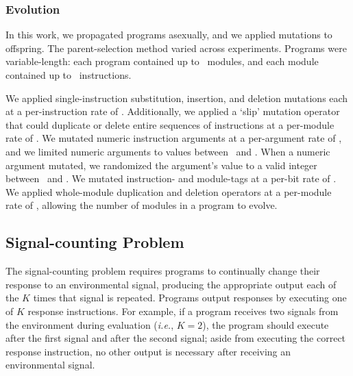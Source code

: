 \subsubsection{Evolution}

In this work, we propagated programs asexually, and we applied mutations to offspring.
The parent-selection method varied across experiments.
Programs were variable-length: each program contained up to \MaxFuncCnt\ modules, and each module contained up to \MaxFuncInstCnt\ instructions.


We applied single-instruction substitution, insertion, and deletion mutations each at a per-instruction rate of \MutRateInstPoint. 
Additionally, we applied a `slip' mutation operator \citep{lalejini_gene_2017} that could duplicate or delete entire sequences of instructions at a per-module rate of \MutRateSeqSlip. 
We mutated numeric instruction arguments at a per-argument rate of \MutRateInstArgSub, and we limited numeric arguments to values between \MinArgValue\ and \MaxArgValue.
When a numeric argument mutated, we randomized the argument's value to a valid integer between \MinArgValue\ and \MaxArgValue.
We mutated instruction- and module-tags at a per-bit rate of \MutRateTagBF.
We applied whole-module duplication and deletion operators at a per-module rate of \MutRateFuncDup, allowing the number of modules in a program to evolve.


\subsection{Signal-counting Problem}
\label{chapter:tag-based-regulation:sec:methods:signal-counting-problem}

The signal-counting problem requires programs to continually change their response to an environmental signal, producing the appropriate output each of the $K$ times that signal is repeated.
Programs output responses by executing one of $K$ response instructions. 
For example, if a program receives two signals from the environment during evaluation (\textit{i.e.}, $K=2$), the program should execute  after the first signal and  after the second signal; aside from executing the correct response instruction, no other output is necessary after receiving an environmental signal.

